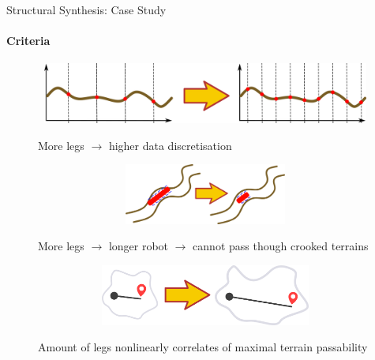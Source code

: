 \documentclass[aspectratio=169]{beamer}
\begin{document}
\begin{frame}[t]{Structural Synthesis: Case Study}
\framesubtitle{Criteria}
\vspace{-0.6cm}
\begin{figure}[H]
    \begin{minipage}{0.58\textwidth}
        \centering\includegraphics[height=2cm,width=1\textwidth,keepaspectratio]{f1.png}
    \end{minipage}\hfill
    \begin{minipage}{0.40\textwidth}
        More legs $\rightarrow$ higher data discretisation
        \label{fig:f1.png}
    \end{minipage}
\end{figure}
\vspace{-0.6cm}

\begin{figure}[H]
    \begin{minipage}{0.58\textwidth}
        \centering\includegraphics[height=2cm,width=1\textwidth,keepaspectratio]{f2.png}
    \end{minipage}\hfill
    \begin{minipage}{0.40\textwidth}
        More legs $\rightarrow$ longer robot $\rightarrow$ cannot pass though crooked terrains
        \label{fig:f2.png}
    \end{minipage}
\end{figure}
\vspace{-0.6cm}

\begin{figure}[H]
    \begin{minipage}{0.58\textwidth}
        \centering\includegraphics[height=2cm,width=1\textwidth,keepaspectratio]{f3.png}
    \end{minipage}\hfill
    \begin{minipage}{0.40\textwidth}
        Amount of legs nonlinearly correlates of maximal terrain passability
        \label{fig:f3.png}
    \end{minipage}
\end{figure}
\end{frame}
\end{document}
